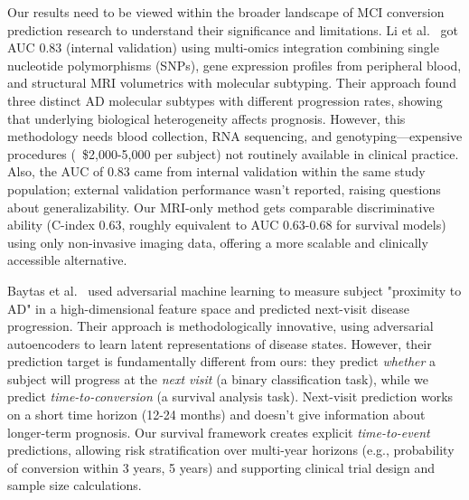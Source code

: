 \documentclass[blue]{ludusofficial}  %
\begin{document}
Our results need to be viewed within the broader landscape of MCI conversion prediction research to understand their significance and limitations. Li et al.~\cite{li2021predicting} got AUC 0.83 (internal validation) using multi-omics integration combining single nucleotide polymorphisms (SNPs), gene expression profiles from peripheral blood, and structural MRI volumetrics with molecular subtyping. Their approach found three distinct AD molecular subtypes with different progression rates, showing that underlying biological heterogeneity affects prognosis. However, this methodology needs blood collection, RNA sequencing, and genotyping—expensive procedures (~\$2,000-5,000 per subject) not routinely available in clinical practice. Also, the AUC of 0.83 came from internal validation within the same study population; external validation performance wasn't reported, raising questions about generalizability. Our MRI-only method gets comparable discriminative ability (C-index 0.63, roughly equivalent to AUC 0.63-0.68 for survival models) using only non-invasive imaging data, offering a more scalable and clinically accessible alternative.

Baytas et al.~\cite{baytas2024predicting} used adversarial machine learning to measure subject "proximity to AD" in a high-dimensional feature space and predicted next-visit disease progression. Their approach is methodologically innovative, using adversarial autoencoders to learn latent representations of disease states. However, their prediction target is fundamentally different from ours: they predict \textit{whether} a subject will progress at the \textit{next visit} (a binary classification task), while we predict \textit{time-to-conversion} (a survival analysis task). Next-visit prediction works on a short time horizon (12-24 months) and doesn't give information about longer-term prognosis. Our survival framework creates explicit \textit{time-to-event} predictions, allowing risk stratification over multi-year horizons (e.g., probability of conversion within 3 years, 5 years) and supporting clinical trial design and sample size calculations.
\end{document}
